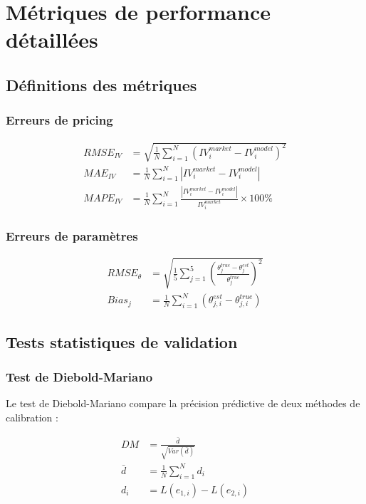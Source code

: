 \section{Métriques de performance détaillées}

\subsection{Définitions des métriques}

\subsubsection{Erreurs de pricing}

\begin{align}
RMSE_{IV} &= \sqrt{\frac{1}{N} \sum_{i=1}^{N} (IV_i^{market} - IV_i^{model})^2} \\
MAE_{IV} &= \frac{1}{N} \sum_{i=1}^{N} |IV_i^{market} - IV_i^{model}| \\
MAPE_{IV} &= \frac{1}{N} \sum_{i=1}^{N} \frac{|IV_i^{market} - IV_i^{model}|}{IV_i^{market}} \times 100\%
\end{align}

\subsubsection{Erreurs de paramètres}

\begin{align}
RMSE_{\theta} &= \sqrt{\frac{1}{5} \sum_{j=1}^{5} \left(\frac{\theta_j^{true} - \theta_j^{est}}{\theta_j^{true}}\right)^2} \\
Bias_j &= \frac{1}{N} \sum_{i=1}^{N} (\theta_{j,i}^{est} - \theta_{j,i}^{true})
\end{align}

\subsection{Tests statistiques de validation}

\subsubsection{Test de Diebold-Mariano}

Le test de Diebold-Mariano compare la précision prédictive de deux méthodes de calibration :

\begin{align}
DM &= \frac{\bar{d}}{\sqrt{Var(\bar{d})}} \\
\bar{d} &= \frac{1}{N} \sum_{i=1}^{N} d_i \\
d_i &= L(e_{1,i}) - L(e_{2,i})
\end{align}

